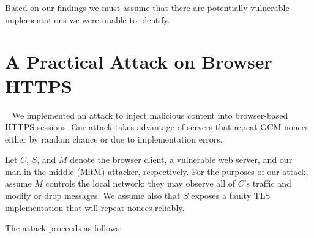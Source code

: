 \documentclass[10pt, a4paper]{article}
\begin{document}
Based on our findings we must assume that there are potentially vulnerable implementations we were unable to identify.


\section{A Practical Attack on Browser HTTPS}~\label{sec:attack}
We implemented an attack to inject malicious content into browser-based HTTPS sessions. Our attack takes advantage of servers that repeat GCM nonces either by random chance or due to implementation errors.

Let $C$, $S$, and $M$ denote the browser client, a vulnerable web server, and our man-in-the-middle (MitM) attacker, respectively. For the purposes of our attack, assume $M$ controls the local network: they may observe all of $C$'s traffic and modify or drop messages. We assume also that $S$ exposes a faulty TLS implementation that will repeat nonces reliably.

The attack proceeds as follows:
\end{document}
